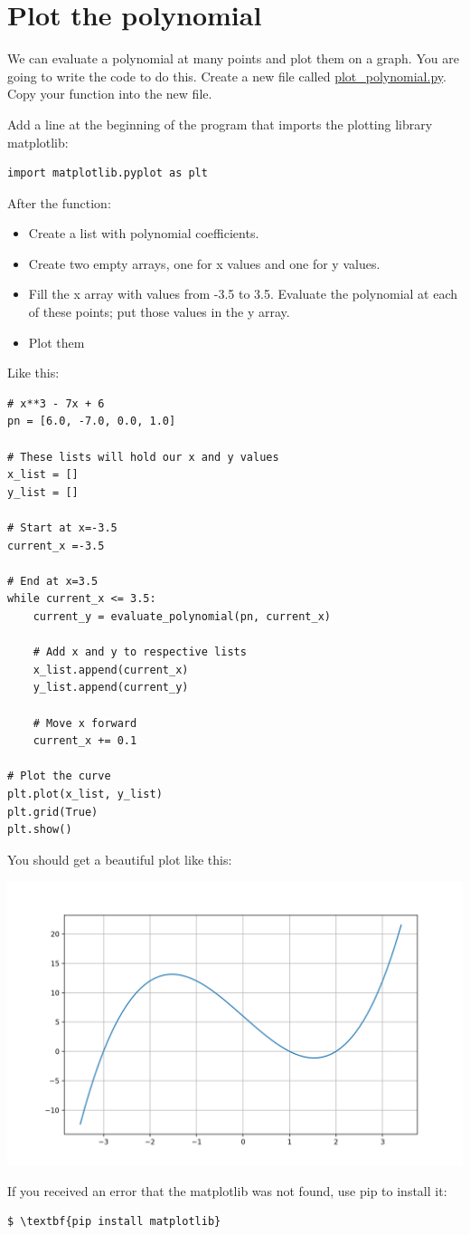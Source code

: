 \section{Plot the polynomial}

We can evaluate a polynomial at many points and plot them on a
graph. You are going to write the code to do this.  Create a new file
called \url{plot_polynomial.py}. Copy your 
function into the new file.

Add a line at the beginning of the program that imports the plotting library matplotlib:
\begin{Verbatim}
import matplotlib.pyplot as plt
\end{Verbatim}

After the  function:
\begin{itemize}
\item Create a list with polynomial coefficients.
\item Create two empty arrays, one for x values and one for y values.
\item Fill the x array with values from -3.5 to 3.5. Evaluate the polynomial at each of these points; put those values
  in the y array.
\item Plot them
\end{itemize}

Like this:
\begin{Verbatim}
# x**3 - 7x + 6
pn = [6.0, -7.0, 0.0, 1.0]

# These lists will hold our x and y values
x_list = []
y_list = []

# Start at x=-3.5
current_x =-3.5

# End at x=3.5
while current_x <= 3.5:
    current_y = evaluate_polynomial(pn, current_x)

    # Add x and y to respective lists
    x_list.append(current_x)
    y_list.append(current_y)

    # Move x forward
    current_x += 0.1

# Plot the curve
plt.plot(x_list, y_list)
plt.grid(True)
plt.show()
\end{Verbatim}

You should get a beautiful plot like this:

\includegraphics[width=\textwidth]{polyplot1.png}

If you received an error that the matplotlib was not found, use pip to install it:
\begin{Verbatim}[commandchars=\\\{\}]
$ \textbf{pip install matplotlib}
\end{Verbatim}

